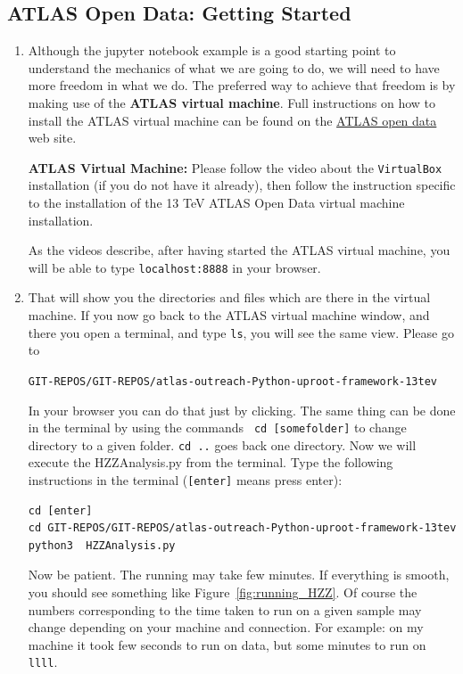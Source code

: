 \subsection{ATLAS Open Data: Getting Started} 

\begin{enumerate}
\item Although the jupyter notebook example is a good starting point to understand the mechanics of what we are going to do, we will need to have more freedom in what we do. The preferred way to achieve that freedom is by making use of the \textbf{ATLAS virtual machine}. Full instructions on how to install the ATLAS virtual machine can be found on the \href{http://atlas.cern/resources/opendata}{ATLAS open data} web site. 

\begin{mybox}
\textbf{ATLAS Virtual Machine:} Please follow the video about the \verb|VirtualBox| installation (if you do not have it already), then follow the instruction specific to the installation of the 13 TeV ATLAS Open Data virtual machine installation. 
\end{mybox}

As the videos describe, after having started the ATLAS virtual machine, you will be able to type \verb|localhost:8888| in your browser. 

\item That will show you the directories and files which are there in the virtual machine. If you now go back to the ATLAS virtual machine window, and there you open a terminal, and type \verb|ls|, you will see the same view. Please go to 

\verb|GIT-REPOS/GIT-REPOS/atlas-outreach-Python-uproot-framework-13tev|

In your browser you can do that just by clicking. The same thing can be done in the terminal by using the commands \verb| cd [somefolder]| to change directory to a given folder. \verb|cd ..| goes back one directory. Now we will execute the HZZAnalysis.py from the terminal. Type the following instructions in the terminal (\verb|[enter]| means press enter):

\begin{verbatim}
cd [enter] 
cd GIT-REPOS/GIT-REPOS/atlas-outreach-Python-uproot-framework-13tev 
python3  HZZAnalysis.py
\end{verbatim}

Now be patient. The running may take few minutes. If everything is smooth, you should see something like Figure~\ref{fig:running_HZZ}. Of course the numbers corresponding to the time taken to run on a given sample may change depending on your machine and connection. For example: on my machine it took few seconds to run on data, but some minutes to run on \verb|llll|. 


\end{enumerate}
